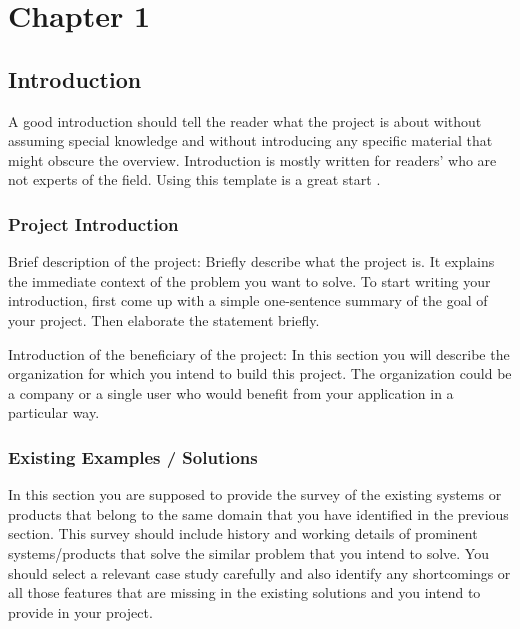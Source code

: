 



\setcounter{chapter}{1}
\setcounter{figure}{0}
\setcounter{table}{0}
\chapter*{Chapter 1}
\section{Introduction}

A good introduction should tell the reader what the project is about without assuming special knowledge and without introducing any specific material that might obscure the overview. Introduction is mostly written for readers' who are not experts of the field. Using this template is a great start \cite{logicalhammad}.

\subsection{Project Introduction}
Brief description of the project: Briefly describe what the project is. It explains the immediate context of the problem you want to solve. To start writing your introduction, first come up with a simple one-sentence summary of the goal of your project. Then elaborate the statement briefly.

Introduction of the beneficiary of the project: In this section you will describe the organization for which you intend to build this project. The organization could be a company or a single user who would benefit from your application in a particular way.


\subsection{Existing Examples / Solutions}
In this section you are supposed to provide the survey of the existing systems or products that belong to the same domain that you have identified in the previous section. 
This survey should include history and working details of prominent systems/products that solve the similar problem that you intend to solve. 
You should select a relevant case study carefully and also identify any shortcomings or all those features that are missing in the existing solutions and you intend to provide in your project.

